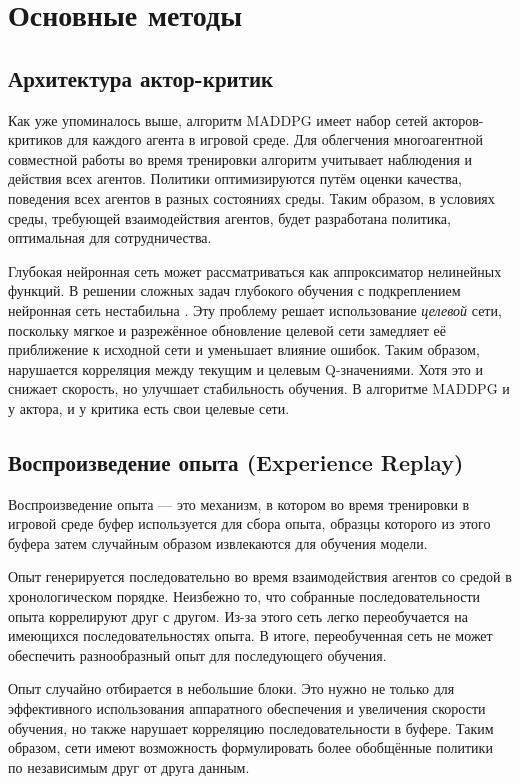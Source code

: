 \section{Основные методы}

\subsection{Архитектура актор-критик}

Как уже упоминалось выше, алгоритм MADDPG имеет набор сетей акторов-критиков для каждого агента в игровой среде. Для облегчения многоагентной совместной работы во время тренировки алгоритм учитывает наблюдения и действия всех агентов. Политики оптимизируются путём оценки качества, поведения всех агентов в разных состояниях среды. Таким образом, в условиях среды, требующей взаимодействия агентов, будет разработана политика, оптимальная для сотрудничества.

Глубокая нейронная сеть может рассматриваться как аппроксиматор нелинейных функций. В решении сложных задач глубокого обучения с подкреплением нейронная сеть нестабильна \cite{lillicrap2015continuous}. Эту проблему решает использование \textit{целевой} сети, поскольку мягкое и разрежённое обновление целевой сети замедляет её приближение к исходной сети и уменьшает влияние ошибок. Таким образом, нарушается корреляция между текущим и целевым Q-значениями. Хотя это и снижает скорость, но улучшает стабильность обучения. В алгоритме MADDPG и у актора, и у критика есть свои целевые сети.

\subsection{Воспроизведение опыта (Experience Replay)}

Воспроизведение опыта — это механизм, в котором во время тренировки в игровой среде буфер используется для сбора опыта, образцы которого из этого буфера затем случайным образом извлекаются для обучения модели.

Опыт генерируется последовательно во время взаимодействия агентов со средой в хронологическом порядке. Неизбежно то, что собранные последовательности опыта коррелируют друг с другом. Из-за этого сеть легко переобучается на имеющихся последовательностях опыта. В итоге, переобученная сеть не может обеспечить разнообразный опыт для последующего обучения.

Опыт случайно отбирается в небольшие блоки. Это нужно не только для эффективного использования аппаратного обеспечения и увеличения скорости обучения, но также нарушает корреляцию последовательности в буфере. Таким образом, сети имеют возможность формулировать более обобщённые политики по независимым друг от друга данным.

